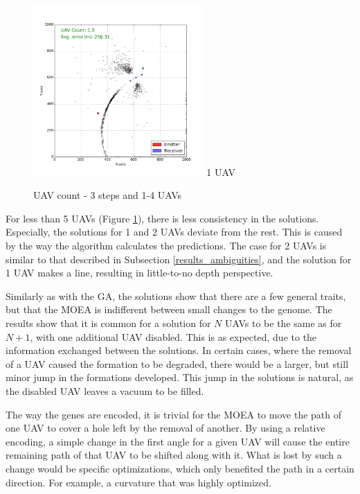 \documentclass[10pt,a4paper]{book}
\begin{document}
\begin{figure}[H]
\begin{minipage}{60mm}
  \centering
\includegraphics[width=65mm]{3_steps/Generation_1000/Pareto_7.png}
  1 \gls{UAV}
\end{minipage}
\caption{\gls{UAV} count - 3 steps and 1-4 \glspl{UAV} }
\label{moea_count_3_14}
\end{figure}

For less than 5 \glspl{UAV} (Figure \ref{moea_count_3_14}), there is less consistency in the solutions. Especially, the solutions for 1 and 2 \glspl{UAV} deviate from the rest. This is caused by the way the algorithm calculates the predictions. The case for 2 \glspl{UAV} is similar to that described in Subsection \ref{results_ambiguities}, and the solution for 1 \gls{UAV} makes a line, resulting in little-to-no depth perspective. 

\newpage

Similarly as with the \gls{GA}, the solutions show that there are a few general traits, but that the \gls{MOEA} is indifferent between small changes to the genome. The results show that it is common for a solution for $N$ \glspl{UAV} to be the same as for $N+1$, with one additional \gls{UAV} disabled. This is as expected, due to the information exchanged between the solutions. In certain cases, where the removal of a \gls{UAV} caused the formation to be degraded, there would be a larger, but still minor jump in the formations developed. This jump in the solutions is natural, as the disabled \gls{UAV} leaves a vacuum to be filled. 

The way the genes are encoded, it is trivial for the \gls{MOEA} to move the path of one \gls{UAV} to cover a hole left by the removal of another. By using a relative encoding, a simple change in the first angle for a given \gls{UAV} will cause the entire remaining path of that \gls{UAV} to be shifted along with it. What is lost by such a change would be specific optimizations, which only benefited the path in a certain direction. For example, a curvature that was highly optimized.
\end{document}
